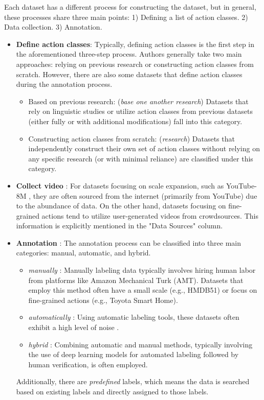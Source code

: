 \documentclass[a4paper]{article}
\begin{document}
Each dataset has a different process for constructing the dataset, but in general, these processes share three main points: 1) Defining a list of action classes. 2) Data collection. 3) Annotation.
\begin{itemize}
	\item \textbf{Define action classes}: Typically, defining action classes is the first step in the aforementioned three-step process. Authors generally take two main approaches: relying on previous research or constructing action classes from scratch. However, there are also some datasets that define action classes during the annotation process.
	\begin{itemize}
		\item Based on previous research: (\textit{base one another research}) Datasets that rely on linguistic studies or utilize action classes from previous datasets (either fully or with additional modifications) fall into this category.
		
		\item Constructing action classes from scratch: (\textit{research}) Datasets that independently construct their own set of action classes without relying on any specific research (or with minimal reliance) are classified under this category.
	\end{itemize}
	
	\item \textbf{Collect video} : For datasets focusing on scale expansion, such as YouTube-8M \cite{YouTube8M}, they are often sourced from the internet (primarily from YouTube) due to the abundance of data. On the other hand, datasets focusing on fine-grained actions tend to utilize user-generated videos from crowdsources. This information is explicitly mentioned in the "Data Sources" column.
	
	\item \textbf{Annotation} : The annotation process can be classified into three main categories: manual, automatic, and hybrid.
	\begin{itemize}
		\item \textit{manually} : Manually labeling data typically involves hiring human labor from platforms like Amazon Mechanical Turk (AMT). Datasets that employ this method often have a small scale (e.g., HMDB51) or focus on fine-grained actions (e.g., Toyota Smart Home).
		
		\item \textit{automatically} : Using automatic labeling tools, these datasets often exhibit a high level of noise \cite{Sports1M}.
		
		\item \textit{hybrid} : Combining automatic and manual methods, typically involving the use of deep learning models for automated labeling followed by human verification, is often employed.
	\end{itemize}
	Additionally, there are \textit{predefined} labels, which means the data is searched based on existing labels and directly assigned to those labels.
\end{itemize}
\end{document}
